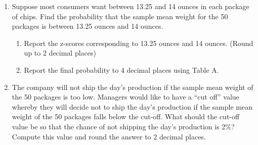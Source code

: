 \begin{enumerate}
\item Suppose most consumers want between 13.25 and 14 ounces in each package of chips.  Find the probability that the sample mean weight for the 50 packages is between 13.25 ounces and 14 ounces.
	\begin{enumerate}
    \item Report the z-scores corresponding to 13.25 ounces and 14 ounces. (Round up to 2 decimal places)
    \item Report the final probability to 4 decimal places using Table A.\\
	\end{enumerate}

\item The company will not ship the day's production if the sample mean weight of the 50 packages is too low. Managers would like to have a ``cut off'' value whereby they will decide not to ship the day's production if the sample mean weight of the 50 packages falls below the cut-off. What should the cut-off value be so that the chance of not shipping the day's production is 2\%? Compute this value and round the answer to 2 decimal places.\\

\end{enumerate}





